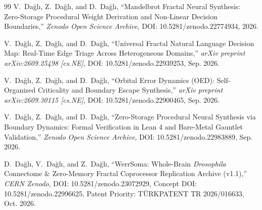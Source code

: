 \documentclass[10pt,twocolumn]{article}
\begin{document}
\begin{thebibliography}{99}
V.~Da\u{g}l\i, Z.~Da\u{g}l\i, and D.~Da\u{g}l\i, ``Mandelbrot Fractal Neural Synthesis: Zero-Storage Procedural Weight Derivation and Non-Linear Decision Boundaries,'' \textit{Zenodo Open Science Archive}, DOI: 10.5281/zenodo.22774934, 2026.

V.~Da\u{g}l\i, Z.~Da\u{g}l\i, and D.~Da\u{g}l\i, ``Universal Fractal Natural Language Decision Map: Real-Time Edge Triage Across Heterogeneous Domains,'' \textit{arXiv preprint arXiv:2609.25498 [cs.NE]}, DOI: 10.5281/zenodo.22939253, Sep. 2026.

V.~Da\u{g}l\i, Z.~Da\u{g}l\i, and D.~Da\u{g}l\i, ``Orbital Error Dynamics (OED): Self-Organized Criticality and Boundary Escape Synthesis,'' \textit{arXiv preprint arXiv:2609.30115 [cs.NE]}, DOI: 10.5281/zenodo.22900465, Sep. 2026.

V.~Da\u{g}l\i, Z.~Da\u{g}l\i, and D.~Da\u{g}l\i, ``Zero-Storage Procedural Neural Synthesis via Boundary Dynamics: Formal Verification in Lean 4 and Bare-Metal Gauntlet Validation,'' \textit{Zenodo Open Science Archive}, DOI: 10.5281/zenodo.22983889, Sep. 2026.

D.~Da\u{g}l\i, V.~Da\u{g}l\i, and Z.~Da\u{g}l\i, ``WerrSoma: Whole-Brain \textit{Drosophila} Connectome \& Zero-Memory Fractal Coprocessor Replication Archive (v1.1),'' \textit{CERN Zenodo}, DOI: 10.5281/zenodo.23072929, Concept DOI: 10.5281/zenodo.22996625, Patent Priority: T\"URKPATENT TR 2026/016633, Oct. 2026.

\end{thebibliography}
\end{document}
